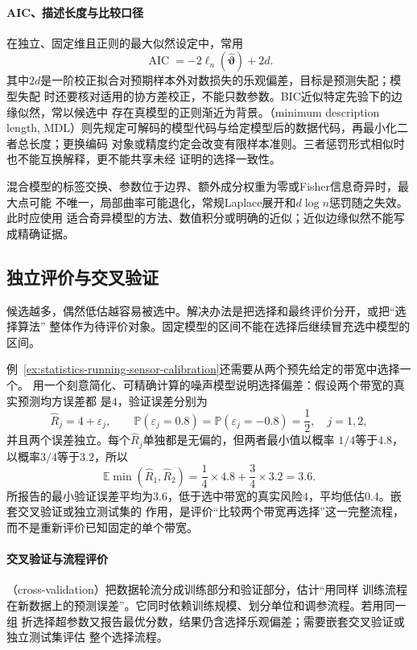 \paragraph{AIC、描述长度与比较口径}
在独立、固定维且正则的最大似然设定中，常用
\[
  \operatorname{AIC}
  =-2\ell_n(\widehat{\bm\vartheta})+2d.
\]
其中\(2d\)是一阶校正拟合对预期样本外对数损失的乐观偏差，目标是预测失配；模型失配
时还要核对适用的协方差校正，不能只数参数。BIC近似特定先验下的边缘似然，常以候选中
存在真模型的正则渐近为背景。（minimum description length,
MDL）则先规定可解码的模型代码与给定模型后的数据代码，再最小化二者总长度；更换编码
对象或精度约定会改变有限样本准则。三者惩罚形式相似时也不能互换解释，更不能共享未经
证明的选择一致性。

混合模型的标签交换、参数位于边界、额外成分权重为零或Fisher信息奇异时，最大点可能
不唯一，局部曲率可能退化，常规Laplace展开和\(d\log n\)惩罚随之失效。此时应使用
适合奇异模型的方法、数值积分或明确的近似；近似边缘似然不能写成精确证据。

\subsection{独立评价与交叉验证}
\label{sec:statistics-validation-pipeline}
候选越多，偶然低估越容易被选中。解决办法是把选择和最终评价分开，或把“选择算法”
整体作为待评价对象。固定模型的区间不能在选择后继续冒充选中模型的区间。

例~\ref{ex:statistics-running-sensor-calibration}还需要从两个预先给定的带宽中选择一个。
用一个刻意简化、可精确计算的噪声模型说明选择偏差：假设两个带宽的真实预测均方误差都
是\(4\)，验证误差分别为
\[
  \widehat R_j=4+\varepsilon_j,\qquad
  \mathbb{P}(\varepsilon_j=0.8)
  =\mathbb{P}(\varepsilon_j=-0.8)=\frac12,
  \quad j=1,2,
\]
并且两个误差独立。每个\(\widehat R_j\)单独都是无偏的，但两者最小值以概率
\(1/4\)等于\(4.8\)，以概率\(3/4\)等于\(3.2\)，所以
\[
  \mathbb{E}\min(\widehat R_1,\widehat R_2)
  =\frac14\times4.8+\frac34\times3.2
  =3.6.
\]
所报告的最小验证误差平均为\(3.6\)，低于选中带宽的真实风险\(4\)，平均低估\(0.4\)。嵌套交叉验证或独立测试集的
作用，是评价“比较两个带宽再选择”这一完整流程，而不是重新评价已知固定的单个带宽。

\paragraph{交叉验证与流程评价}
（cross-validation）把数据轮流分成训练部分和验证部分，估计“用同样
训练流程在新数据上的预测误差”。它同时依赖训练规模、划分单位和调参流程。若用同一组
折选择超参数又报告最优分数，结果仍含选择乐观偏差；需要嵌套交叉验证或独立测试集评估
整个选择流程。

